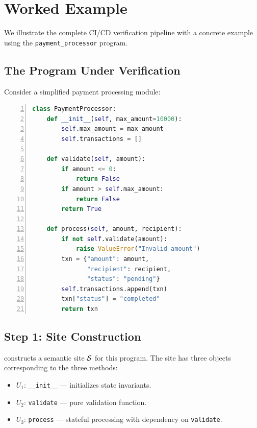 \documentclass[11pt]{article}
\begin{document}
\section{Worked Example}\label{sec:worked-example}

We illustrate the complete CI/CD verification pipeline with a concrete
example using the \texttt{payment\_processor} program.

\subsection{The Program Under Verification}

Consider a simplified payment processing module:

\begin{lstlisting}[language=Python,basicstyle=\small\ttfamily,
  frame=single,xleftmargin=1em,numbers=left]
class PaymentProcessor:
    def __init__(self, max_amount=10000):
        self.max_amount = max_amount
        self.transactions = []

    def validate(self, amount):
        if amount <= 0:
            return False
        if amount > self.max_amount:
            return False
        return True

    def process(self, amount, recipient):
        if not self.validate(amount):
            raise ValueError("Invalid amount")
        txn = {"amount": amount,
               "recipient": recipient,
               "status": "pending"}
        self.transactions.append(txn)
        txn["status"] = "completed"
        return txn
\end{lstlisting}

\subsection{Step 1: Site Construction}

\JuGeo{} constructs a semantic site $\mathcal{S}$ for this program. The site has
three objects corresponding to the three methods:
\begin{itemize}[leftmargin=*]
  \item $U_1$: \texttt{\_\_init\_\_} --- initializes state invariants.
  \item $U_2$: \texttt{validate} --- pure validation function.
  \item $U_3$: \texttt{process} --- stateful processing with dependency on
        \texttt{validate}.
\end{itemize}
\end{document}
